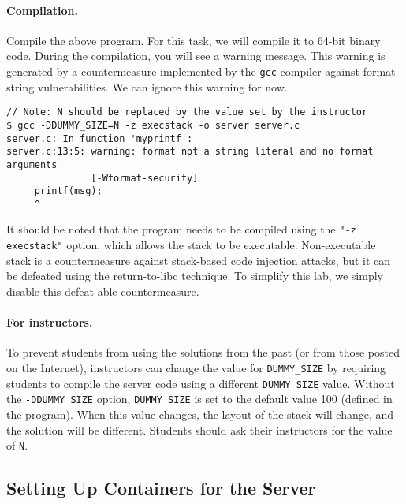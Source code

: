\paragraph{Compilation.} Compile the above program. For this task,
we will compile it to 64-bit binary code. 
During the compilation, you will see a
warning message. This warning is generated by a countermeasure implemented by
the \texttt{gcc} compiler against format string vulnerabilities. We can
ignore this warning for now. 


\begin{lstlisting}
// Note: N should be replaced by the value set by the instructor
$ gcc -DDUMMY_SIZE=N -z execstack -o server server.c
server.c: In function 'myprintf':
server.c:13:5: warning: format not a string literal and no format arguments 
               [-Wformat-security]
     printf(msg);
     ^
\end{lstlisting}

It should be noted that the program needs to be compiled using 
the \texttt{"-z execstack"} option, which allows the stack to be 
executable. Non-executable stack is a countermeasure against stack-based 
code injection attacks, but 
it can be defeated using the return-to-libc technique. To simplify 
this lab, we simply disable this defeat-able countermeasure. 



\paragraph{For instructors.} 
To prevent students from using the solutions from the past (or from those 
posted on the Internet), instructors can change the 
value for \texttt{DUMMY\_SIZE} by requiring students to compile the 
server code using a different \texttt{DUMMY\_SIZE} value. 
Without the \texttt{-DDUMMY\_SIZE}  
option, \texttt{DUMMY\_SIZE} is set to the default value 100 (defined
in the program). 
When this value changes, the layout of the stack 
will change, and the solution will be different. 
Students should ask their instructors for
the value of \texttt{N}.



\subsection{Setting Up Containers for the Server} 

